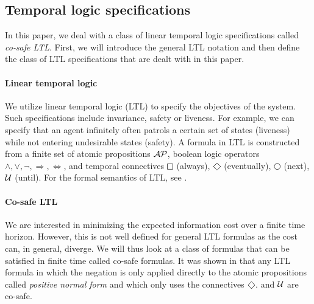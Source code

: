 \subsection{Temporal logic specifications} In this paper, we deal with a class of linear temporal logic specifications called \emph{co-safe LTL}. First, we will introduce the general LTL notation and then define the class of LTL specifications that are dealt with in this paper.

\paragraph*{Linear temporal logic} We utilize linear temporal logic (LTL) to specify the objectives of the system. Such specifications include invariance, safety or liveness. For example, we can specify that an agent infinitely often patrols a certain set of states (liveness) while not entering undesirable states (safety). A formula in LTL is constructed from a finite set of atomic propositions $\mathcal{AP}$, boolean logic operators $\wedge,\vee,\lnot,\Rightarrow,\Leftrightarrow$, and temporal connectives $\LTLsquare$ (always), $\LTLdiamond$ (eventually), $\LTLcircle$ (next), $\operatorname{\mathcal{U}}$ (until). For the formal semantics of LTL, see \cite{BaierKatoen08}.

\paragraph*{Co-safe LTL} We are interested in minimizing the expected information cost over a finite time horizon. However, this is not well defined for general LTL formulas as the cost can, in general, diverge. We will thus look at a class of formulas that can be satisfied in finite time called co-safe formulas. It was shown in \cite{kupferman2001model} that any LTL formula in which the negation is only applied directly to the atomic propositions called \emph{positive normal form} and which only uses the connectives $\LTLdiamond$. and $\operatorname{\mathcal{U}}$ are co-safe. 

